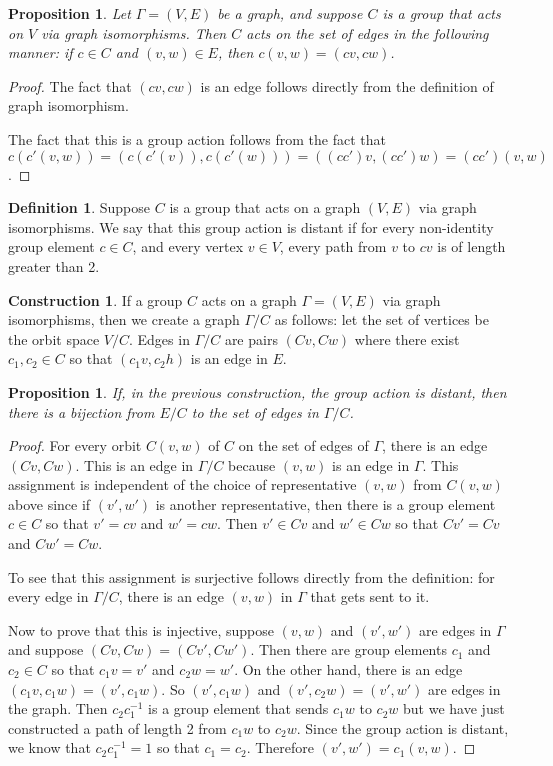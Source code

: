 \documentclass[12pt,twoside,singlespace]{article}
\numberwithin{equation}{section}
\newtheorem{prop}[equation]{Proposition}
\theoremstyle{definition}
\newtheorem{definition}[equation]{Definition}
\newtheorem{construction}[equation]{Construction}
\begin{document}
\begin{prop}
Let $\Gamma=(V,E)$ be a graph, and suppose $C$ is a group that acts on $V$ via graph isomorphisms.  Then $C$ acts on the set of edges in the following manner: if $c\in C$ and $(v,w)\in E$, then $c(v,w)=(cv,cw)$.
\end{prop}
\begin{proof}
The fact that $(cv,cw)$ is an edge follows directly from the definition of graph isomorphism.

The fact that this is a group action follows from the fact that $c(c'(v,w))=(c(c'(v)),c(c'(w)))=((cc')v,(cc')w)=(cc')(v,w)$.
\end{proof}

\begin{definition}
Suppose $C$ is a group that acts on a graph $(V,E)$ via graph isomorphisms.  We say that this group action is distant if for every non-identity group element $c\in C$, and every vertex $v\in V$, every path from $v$ to $cv$ is of length greater than 2.
\end{definition}

\begin{construction}
If a group $C$ acts on a graph $\Gamma=(V,E)$ via graph isomorphisms, then we create a graph $\Gamma/C$ as follows: let the set of vertices be the orbit space $V/C$.  Edges in $\Gamma/C$ are pairs $(Cv,Cw)$ where there exist $c_1, c_2\in C$ so that $(c_1v,c_2h)$ is an edge in $E$.
\end{construction}

\begin{prop}
\label{prop:distiso}
If, in the previous construction, the group action is distant, then there is a bijection from $E/C$ to the set of edges in $\Gamma/C$.
\end{prop}
\begin{proof}
For every orbit $C(v,w)$ of $C$ on the set of edges of $\Gamma$, there is an edge $(Cv,Cw)$.  This is an edge in $\Gamma/C$ because $(v,w)$ is an edge in $\Gamma$.  This assignment is independent of the choice of representative $(v,w)$ from $C(v,w)$ above since if $(v',w')$ is another representative, then there is a group element $c\in C$ so that $v'=cv$ and $w'=cw$.  Then $v'\in Cv$ and $w'\in Cw$ so that $Cv'=Cv$ and $Cw'=Cw$.

To see that this assignment is surjective follows directly from the definition: for every edge in $\Gamma/C$, there is an edge $(v,w)$ in $\Gamma$ that gets sent to it.

Now to prove that this is injective, suppose $(v,w)$ and $(v',w')$ are edges in $\Gamma$ and suppose $(Cv,Cw)=(Cv',Cw')$.  Then there are group elements $c_1$ and $c_2\in C$ so that $c_1v=v'$ and $c_2w=w'$.  On the other hand, there is an edge $(c_1v,c_1w)=(v',c_1w)$.  So $(v',c_1w)$ and $(v',c_2w)=(v',w')$ are edges in the graph.  Then $c_2c_1^{-1}$ is a group element that sends $c_1w$ to $c_2w$ but we have just constructed a path of length 2 from $c_1w$ to $c_2w$.  Since the group action is distant, we know that $c_2c_1^{-1}=1$ so that $c_1=c_2$.  Therefore $(v',w')=c_1(v,w)$.
\end{proof}
\end{document}
